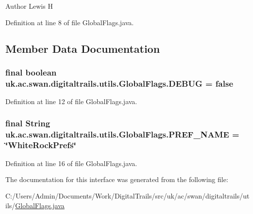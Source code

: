 \begin{DoxyAuthor}{Author}
Lewis H 
\end{DoxyAuthor}


Definition at line 8 of file Global\+Flags.\+java.



\subsection{Member Data Documentation}
\hypertarget{interfaceuk_1_1ac_1_1swan_1_1digitaltrails_1_1utils_1_1_global_flags_ab66530eac1afabd42e6dfa7819cba196}{
\subsubsection[{D\+E\+B\+U\+G}]{\setlength{\rightskip}{0pt plus 5cm}final boolean uk.\+ac.\+swan.\+digitaltrails.\+utils.\+Global\+Flags.\+D\+E\+B\+U\+G = false\hspace{0.3cm}{\ttfamily [static]}}}\label{interfaceuk_1_1ac_1_1swan_1_1digitaltrails_1_1utils_1_1_global_flags_ab66530eac1afabd42e6dfa7819cba196}


Definition at line 12 of file Global\+Flags.\+java.

\hypertarget{interfaceuk_1_1ac_1_1swan_1_1digitaltrails_1_1utils_1_1_global_flags_a95ec83059f5234100d715662a0c79ba8}{
\subsubsection[{P\+R\+E\+F\+\_\+\+N\+A\+M\+E}]{\setlength{\rightskip}{0pt plus 5cm}final String uk.\+ac.\+swan.\+digitaltrails.\+utils.\+Global\+Flags.\+P\+R\+E\+F\+\_\+\+N\+A\+M\+E = \char`\"{}White\+Rock\+Prefs\char`\"{}\hspace{0.3cm}{\ttfamily [static]}}}\label{interfaceuk_1_1ac_1_1swan_1_1digitaltrails_1_1utils_1_1_global_flags_a95ec83059f5234100d715662a0c79ba8}


Definition at line 16 of file Global\+Flags.\+java.



The documentation for this interface was generated from the following file\+:\begin{DoxyCompactItemize}
\item 
C\+:/\+Users/\+Admin/\+Documents/\+Work/\+Digital\+Trails/src/uk/ac/swan/digitaltrails/utils/\hyperlink{_global_flags_8java}{Global\+Flags.\+java}\end{DoxyCompactItemize}
